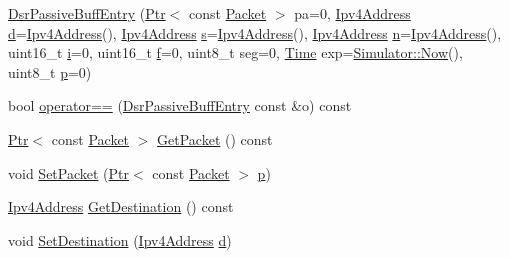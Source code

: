 \begin{DoxyCompactItemize}
\item 
\hyperlink{classns3_1_1dsr_1_1DsrPassiveBuffEntry_ae0362810a5dd6889134c0770640cdd26}{Dsr\+Passive\+Buff\+Entry} (\hyperlink{classns3_1_1Ptr}{Ptr}$<$ const \hyperlink{classns3_1_1Packet}{Packet} $>$ pa=0, \hyperlink{classns3_1_1Ipv4Address}{Ipv4\+Address} \hyperlink{lte__pathloss_8m_a1aabac6d068eef6a7bad3fdf50a05cc8}{d}=\hyperlink{classns3_1_1Ipv4Address}{Ipv4\+Address}(), \hyperlink{classns3_1_1Ipv4Address}{Ipv4\+Address} \hyperlink{generate__test__data__lte__sinr_8m_ad83eeb3a142285d1243a08c6b7026df8}{s}=\hyperlink{classns3_1_1Ipv4Address}{Ipv4\+Address}(), \hyperlink{classns3_1_1Ipv4Address}{Ipv4\+Address} \hyperlink{lte__link__budget__x2__handover__measures_8m_abdb05bc5a064cf642a06c83b3392f148}{n}=\hyperlink{classns3_1_1Ipv4Address}{Ipv4\+Address}(), uint16\+\_\+t \hyperlink{lte__uplink__power__control_8m_a6f6ccfcf58b31cb6412107d9d5281426}{i}=0, uint16\+\_\+t \hyperlink{80211b_8c_ae7ffc1a8f84fa47a0812b2f2b9627132}{f}=0, uint8\+\_\+t seg=0, \hyperlink{classns3_1_1Time}{Time} exp=\hyperlink{classns3_1_1Simulator_ac3178fa975b419f7875e7105be122800}{Simulator\+::\+Now}(), uint8\+\_\+t \hyperlink{lte__link__budget__x2__handover__measures_8m_ac9de518908a968428863f829398a4e62}{p}=0)
\item 
bool \hyperlink{classns3_1_1dsr_1_1DsrPassiveBuffEntry_ae6b8178352f1539ae420c223098c81b7}{operator==} (\hyperlink{classns3_1_1dsr_1_1DsrPassiveBuffEntry}{Dsr\+Passive\+Buff\+Entry} const \&o) const 
\item 
\hyperlink{classns3_1_1Ptr}{Ptr}$<$ const \hyperlink{classns3_1_1Packet}{Packet} $>$ \hyperlink{classns3_1_1dsr_1_1DsrPassiveBuffEntry_a0190d29a45f23381dcea60c2c049cd32}{Get\+Packet} () const 
\item 
void \hyperlink{classns3_1_1dsr_1_1DsrPassiveBuffEntry_aaa4220253ec2b39b5dc4d877dde8f9ba}{Set\+Packet} (\hyperlink{classns3_1_1Ptr}{Ptr}$<$ const \hyperlink{classns3_1_1Packet}{Packet} $>$ \hyperlink{lte__link__budget__x2__handover__measures_8m_ac9de518908a968428863f829398a4e62}{p})
\item 
\hyperlink{classns3_1_1Ipv4Address}{Ipv4\+Address} \hyperlink{classns3_1_1dsr_1_1DsrPassiveBuffEntry_a883bfb4921022af6a8cc0e00db92a869}{Get\+Destination} () const 
\item 
void \hyperlink{classns3_1_1dsr_1_1DsrPassiveBuffEntry_a439cdae0f3aeccfd150848590d8ead34}{Set\+Destination} (\hyperlink{classns3_1_1Ipv4Address}{Ipv4\+Address} \hyperlink{lte__pathloss_8m_a1aabac6d068eef6a7bad3fdf50a05cc8}{d})

\end{DoxyCompactItemize}
